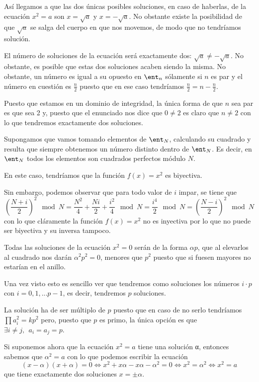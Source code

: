 \begin{problem}[7]
Así llegamos a que las dos únicas posibles soluciones, en caso de haberlas, de la ecuación $x^2=a$ son $x=\sqrt{a}$ y $x=-\sqrt{a}$. No obstante existe la posibilidad de que $\sqrt{a}$ se salga del cuerpo en que nos movemos, de modo que no tendríamos solución.

El número de soluciones de la ecuación será exactamente dos: $\sqrt{a}\neq - \sqrt{a}$. No obstante, es posible que estas dos soluciones acaben siendo la misma. No obstante, un número es igual a su opuesto en $\ent_n$ sólamente si $n$ es par y el número en cuestión es $\frac{n}{2}$ puesto que en ese caso tendríamos $\frac{n}{2} = n -\frac{n}{2}$.

Puesto que estamos en un dominio de integridad, la única forma de que $n$ sea par es que sea 2 y, puesto que el enunciado nos dice que $0\neq 2$ es claro que $n\neq 2$ con lo que tendremos exactamente dos soluciones.


\spart

Supongamos que vamos tomando elementos de $\ent_N$, calculando su cuadrado y resulta que siempre obtenemos un número distinto dentro de $\ent_N$. Es decir, en $\ent_N$ todos los elementos son cuadrados perfectos módulo $N$.

En este caso, tendríamos que la función $f(x)=x^2$ es biyectiva.

Sin embargo, podemos observar que para todo valor de $i$ impar, se tiene que
\[\left(\frac{N+i}{2}\right)^2 \mod N= \frac{N^2}{4} + \frac{Ni}{2} + \frac{i^2}{4} \mod N = \frac{i^4}{2} \mod N = \left(\frac{N-i}{2}\right)^2 \mod N\]
con lo que cláramente la función $f(x)=x^2$ no es inyectiva por lo que no puede ser biyectiva y su inversa tampoco.

\spart

Todas las soluciones de la ecuación $x^2=0$ serán de la forma $αp$, que al elevarlos al cuadrado nos darán $α^2p^2=0$, menores que $p^2$ puesto que si fuesen mayores no estarían en el anillo.

Una vez visto esto es sencillo ver que tendremos como soluciones los números $i\cdot p$ con $i=0,1,...p-1$, es decir, tendremos $p$ soluciones.

\obs La solución ha de ser múltiplo de $p$ puesto que en caso de no serlo tendríamos $\prod a_i^2 = kp^2$ pero, puesto que $p$ es primo, la única opción es que $\exists i\neq j, \ \ a_i=a_j=p$.

Si suponemos ahora que la ecuación $x^2=a$ tiene una solución α, entonces sabemos que $α^2=a$ con lo que podemos escribir la ecuación
\[(x-α)(x+α)=0 \iff x^2+xα-xα-α^2=0 \iff x^2=α^2 \iff x^2=a\]
que tiene exactamente dos soluciones $x=\pm α$.


\end{problem}
